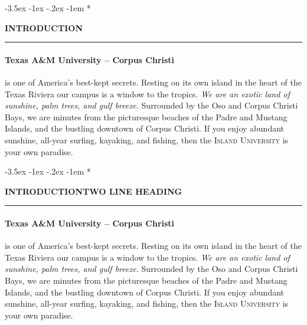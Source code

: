 \documentclass[pagesize,DIV14]{scrartcl}
\makeatletter
\renewcommand\section{\@startsection {section}{1}{\z@}%
                                   {-3.5ex \@plus -1ex \@minus -.2ex}%
                                   {-1em}%
                                   {\normalfont}}
\let\xsection=\section
\renewcommand{\section}[1]{\xsection*{\AvenirNext\fontsize{1em}{1.2em}\selectfont\bfseries\color{Blue} \uppercase{#1} \newline \color{Blue}\rule{2em}{1pt}}}
\makeatother
\begin{document}
\section{Introduction}
\begin{multicols}{2}

\paragraph*{Texas A\&M University -- Corpus Christi}\hspace{-1ex}is one of America's best-kept secrets. Resting on its own \mbox{island} in the heart of the Texas Riviera our campus is a window to the tropics. \textit{We are an exotic land of sunshine, palm trees, and gulf breeze.} Surrounded by the Oso and Corpus Christi Bays, we are minutes from the picturesque beaches of the Padre and Mustang Islands, and the bustling downtown of Corpus Christi. If you enjoy abundant sunshine, all-year surfing, kayaking, and fishing, then the \textsc{Island University} is your own paradise.

\section{Introduction\newline Two Line Heading}

\paragraph*{Texas A\&M University -- Corpus Christi}\hspace{-1ex}is one of America's best-kept secrets. Resting on its own \mbox{island} in the heart of the Texas Riviera our campus is a window to the tropics. \textit{We are an exotic land of sunshine, palm trees, and gulf breeze.} Surrounded by the Oso and Corpus Christi Bays, we are minutes from the picturesque beaches of the Padre and Mustang Islands, and the bustling downtown of Corpus Christi. If you enjoy abundant sunshine, all-year surfing, kayaking, and fishing, then the \textsc{Island University} is your own paradise.

\end{multicols}

\clearpage
\end{document}
